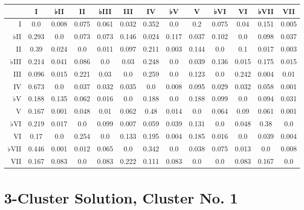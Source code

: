 \begin{table}[htbp]
\begin{minipage}{\linewidth}
\setlength{\tymax}{0.5\linewidth}
\centering
\small
\begin{tabulary}{\textwidth}{@{}RCCCCCCCCCCCC@{}} \toprule
&I&♭II&II&♭III&III&IV&♭V&V&♭VI&VI&♭VII&VII\\
\midrule
I&0.0&0.008&0.075&0.061&0.032&0.352&0.0&0.2&0.075&0.04&0.151&0.005\\
♭II&0.293&0.0&0.073&0.073&0.146&0.024&0.117&0.037&0.102&0.0&0.098&0.037\\
II&0.39&0.024&0.0&0.011&0.097&0.211&0.003&0.144&0.0&0.1&0.017&0.003\\
♭III&0.214&0.041&0.086&0.0&0.03&0.248&0.0&0.039&0.136&0.015&0.175&0.015\\
III&0.096&0.015&0.221&0.03&0.0&0.259&0.0&0.123&0.0&0.242&0.004&0.01\\
IV&0.673&0.0&0.037&0.032&0.035&0.0&0.008&0.095&0.029&0.032&0.058&0.001\\
♭V&0.188&0.135&0.062&0.016&0.0&0.188&0.0&0.188&0.099&0.0&0.094&0.031\\
V&0.167&0.001&0.048&0.01&0.062&0.48&0.014&0.0&0.064&0.09&0.061&0.001\\
♭VI&0.219&0.017&0.0&0.099&0.007&0.059&0.039&0.131&0.0&0.048&0.38&0.0\\
VI&0.17&0.0&0.254&0.0&0.133&0.195&0.004&0.185&0.016&0.0&0.039&0.004\\
♭VII&0.446&0.001&0.012&0.065&0.0&0.342&0.0&0.038&0.075&0.013&0.0&0.008\\
VII&0.167&0.083&0.0&0.083&0.222&0.111&0.083&0.0&0.0&0.083&0.167&0.0\\

\bottomrule

\end{tabulary}
\end{minipage}
\end{table}

\section{3-Cluster Solution, Cluster No. 1}
\label{3-clustersolutionclusterno.1}

